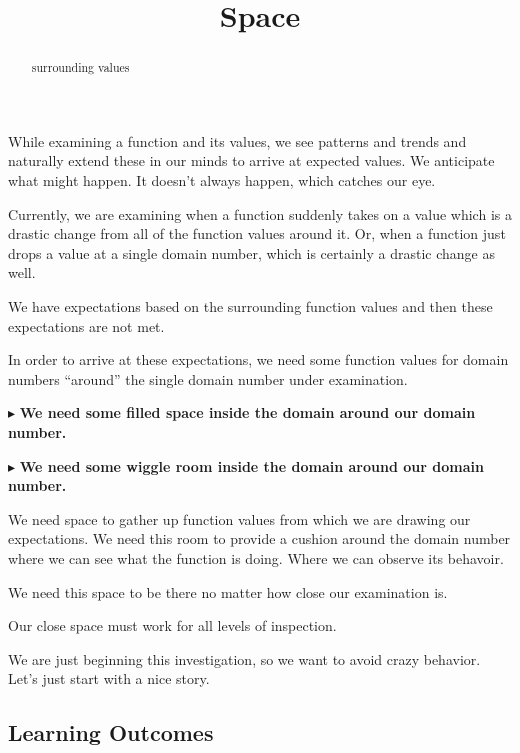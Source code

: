 \documentclass{ximera}
\title{Space}
\begin{document}
\begin{abstract}
surrounding values
\end{abstract}
\maketitle




While examining a function and its values, we see patterns and trends and naturally extend these in our minds to arrive at expected values. We anticipate what might happen.  It doesn't always happen, which catches our eye. 

Currently, we are examining when a function suddenly takes on a value which is a drastic change from all of the function values around it.  Or, when a function just drops a value at a single domain number, which is certainly a drastic change as well.

We have expectations based on the surrounding function values and then these expectations are not met.

In order to arrive at these expectations, we need some function values for domain numbers ``around'' the single domain number under examination. 


$\blacktriangleright$ \textbf{\textcolor{purple!85!blue}{We need some filled space inside the domain around our domain number.}} 

$\blacktriangleright$ \textbf{\textcolor{purple!85!blue}{We need some wiggle room inside the domain around our domain number.}} 




We need space to gather up function values from which we are drawing our expectations.  We need this room to provide a cushion around the domain number where we can see what the function is doing. Where we can observe its behavoir. 


We need this space to be there no matter how close our examination is.  


Our close space must work for all levels of inspection.


We are just beginning this investigation, so we want to avoid crazy behavior.  Let's just start with a nice story.













\subsection*{Learning Outcomes}
\end{document}
